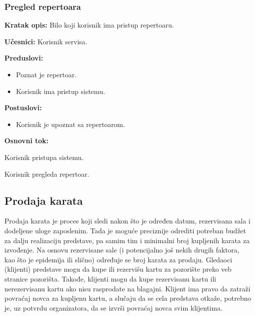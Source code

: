 \documentclass[a4paper]{article}
\begin{document}
\subsubsection{Pregled repertoara} 
\noindent\textbf{Kratak opis:} Bilo koji korisnik ima pristup repertoaru.

\noindent\textbf{Učesnici:} Korisnik servisa.

\noindent\textbf{Preduslovi:}
  \begin{itemize}
    \item Poznat je repertoar.
    \item Korisnik ima pristup sistemu.
  \end{itemize}

\noindent\textbf{Postuslovi:} 
  \begin{itemize}
    \item Korisnik je upoznat sa repertoarom.
  \end{itemize}

\noindent\textbf{Osnovni tok:}
  \begin{legal}
    \item Korisnik pristupa sistemu.
    \item Korisnik pregleda repertoar.
  \end{legal}



\newpage
\subsection{Prodaja karata}
Prodaja karata je proces koji sledi nakon što je određen datum, rezervisana sala i dodeljene uloge
zaposlenim. Tada je moguće preciznije odrediti potreban budžet za dalju realizaciju predstave, pa
samim tim i minimalni broj kupljenih karata za izvođenje. Na osnovu rezervisane sale (i potencijalno još 
nekih drugih faktora, kao što je epidemija ili slično) određuje se broj karata za prodaju. Gledaoci 
(klijenti) predstave mogu da kupe ili rezervišu kartu za pozorište preko veb stranice pozorišta. 
Takođe, klijenti mogu da kupe rezervisanu kartu ili nerezervisanu kartu ako nisu rasprodate na blagajni.
Klijent ima pravo da zatraži povraćaj novca za kupljenu kartu, a slučaju da se cela predstava otkaže,
potrebno je, uz potvrdu organizatora, da se izvrši povraćaj novca svim klijentima.
\end{document}
